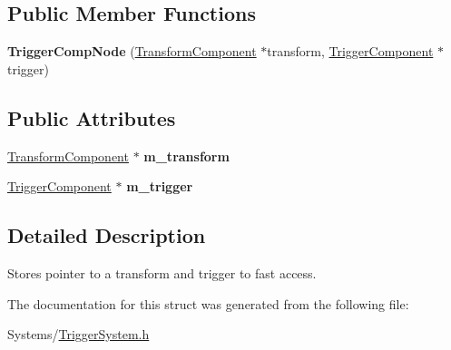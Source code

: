 \subsection*{Public Member Functions}
\begin{DoxyCompactItemize}
\item 
\mbox{\label{structTriggerCompNode_a6f0616c6b940996e2561b9b3dba0ed8c}} 
{\bfseries Trigger\+Comp\+Node} (\hyperlink{classTransformComponent}{Transform\+Component} $\ast$transform, \hyperlink{classTriggerComponent}{Trigger\+Component} $\ast$trigger)
\end{DoxyCompactItemize}
\subsection*{Public Attributes}
\begin{DoxyCompactItemize}
\item 
\mbox{\label{structTriggerCompNode_a1f6ffa50b2dd6b89b67c7499ad8ebf27}} 
\hyperlink{classTransformComponent}{Transform\+Component} $\ast$ {\bfseries m\+\_\+transform}
\item 
\mbox{\label{structTriggerCompNode_a27ad54ad6c9f266c6ee20483c5132024}} 
\hyperlink{classTriggerComponent}{Trigger\+Component} $\ast$ {\bfseries m\+\_\+trigger}
\end{DoxyCompactItemize}


\subsection{Detailed Description}
Stores pointer to a transform and trigger to fast access. 

The documentation for this struct was generated from the following file\+:\begin{DoxyCompactItemize}
\item 
Systems/\hyperlink{TriggerSystem_8h}{Trigger\+System.\+h}\end{DoxyCompactItemize}
